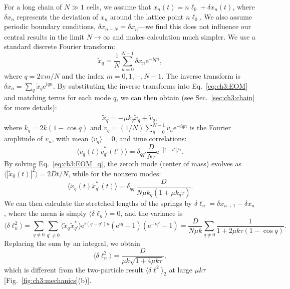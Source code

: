 For a long chain of $N\gg 1$ cells, we assume that $x_n(t)=n\ell_0+\delta x_n(t)$, where $\delta x_n$ represents the deviation of $x_n$ around the lattice point $n\ell_0$. We also assume periodic boundary conditions, $\delta x_{n+N} = \delta x_{n}$---we find this does not influence our central results in the limit $N \to \infty$ and makes calculation much simpler. We use a standard discrete Fourier transform:
\begin{equation}
    \tilde{x}_q=\frac{1}{N}\sum_{n=0}^{N-1}\delta x_n\mathrm{e}^{-iqn},
\end{equation}
where $q=2\pi m/N$ and the index $m=0,1,\cdots,N-1$. The inverse transform is $\delta x_n=\sum_q\tilde{x}_q\mathrm{e}^{iqn}$. By substituting the inverse transforms into Eq.~\eqref{eq:ch3:EOM} and matching terms for each mode $q$, we can then obtain (see Sec.~\ref{sec:ch3:chain} for more details):
\begin{equation}\label{eq:ch3:EOM_q}
    \dot{\tilde{x}}_q = -\mu k_q\tilde{x}_q+ \tilde{v}_q,
\end{equation}
where $k_q=2k(1-\cos q)$ and $\tilde{v}_q=(1/N)\sum_{n=0}^{N-1}v_n\mathrm{e}^{-iqn}$ is the Fourier amplitude of $v_n$, with mean $\langle \tilde{v}_q\rangle = 0$, and time correlations:
\begin{equation}
    \langle \tilde{v}^{\phantom{\ast}}_q(t)\tilde{v}^\ast_{q'}(t')\rangle = \delta_{qq'}\frac{D}{N\tau}\mathrm{e}^{-|t-t'|/\tau}.
\end{equation}
By solving Eq.~\eqref{eq:ch3:EOM_q}, the zeroth mode (center of mass) evolves as $\langle| \tilde{x}_0(t)|^2\rangle = 2D t/N$, while for the nonzero modes:
\begin{equation}
    \langle \tilde{x}^{\phantom{\ast}}_q(t)\tilde{x}^\ast_{q'}(t)\rangle =\delta_{qq'}\frac{D}{N\mu k_q(1+\mu k_q\tau)}.
\end{equation}
We can then calculate the stretched lengths of the springs by $\delta\ell_n = \delta x_{n+1}-\delta x_n$, where the mean is simply $\langle\delta\ell_n\rangle = 0$, and the variance is
\begin{equation*}
    \langle \delta\ell_n^2\rangle
    =\sum_{q\neq 0 }\sum_{q'\neq 0}\langle \tilde{x}^{\phantom{\ast}}_q\tilde{x}^\ast_{q'}\rangle \mathrm{e}^{i(q-q')n}(\mathrm{e}^{iq}-1)(\mathrm{e}^{-iq'}-1)=\frac{D}{N\mu k}\sum_{q\neq 0}\frac{1}{1+2\mu k\tau (1-\cos q)}.
\end{equation*}
Replacing the sum by an integral, we obtain
\begin{equation}
    \langle \delta\ell_n^2\rangle = \frac{D}{\mu k\sqrt{1+4\mu k\tau}},
\end{equation}
which is different from the two-particle result $\langle\delta\ell^2\rangle_2$ at large $\mu k \tau$ [Fig.~\ref{fig:ch3:mechanics}(b)].

